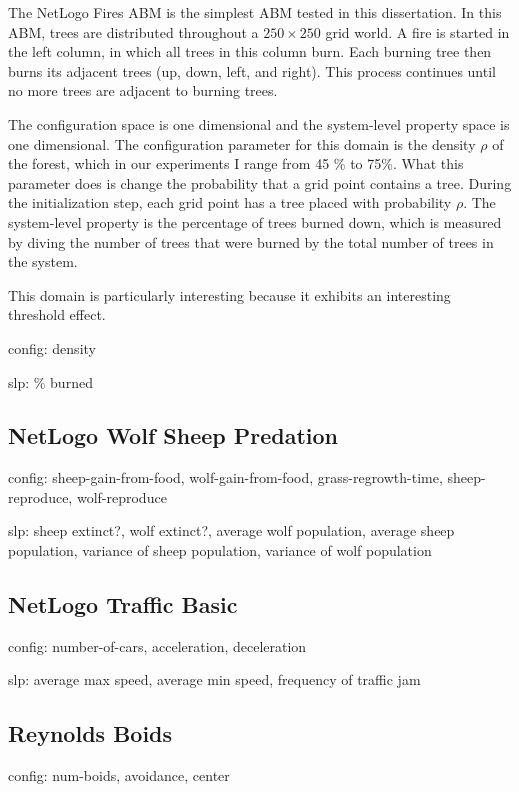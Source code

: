 The NetLogo Fires ABM is the simplest ABM tested in this dissertation.
In this ABM, trees are distributed throughout a $250 \times 250$ grid world.
A fire is started in the left column, in which all trees in this column burn.
Each burning tree then burns its adjacent trees (up, down, left, and right).
This process continues until no more trees are adjacent to burning trees.

The configuration space is one dimensional and the system-level property space is one dimensional.
The configuration parameter for this domain is the density $\rho$ of the forest, which in our experiments I range from 45 \% to 75\%.
What this parameter does is change the probability that a grid point contains a tree.
During the initialization step, each grid point has a tree placed with probability $\rho$.
The system-level property is the percentage of trees burned down, which is measured by diving the number of trees that were burned by the total number of trees in the system.


This domain is particularly interesting because it exhibits an interesting threshold effect.


config: density

slp: \% burned

 \subsection{NetLogo Wolf Sheep Predation}

config: sheep-gain-from-food, wolf-gain-from-food, grass-regrowth-time, sheep-reproduce, wolf-reproduce

slp: sheep extinct?, wolf extinct?, average wolf population, average sheep population, variance of sheep population, variance of wolf population

 \subsection{NetLogo Traffic Basic}

config: number-of-cars, acceleration, deceleration

slp: average max speed, average min speed, frequency of traffic jam

 \subsection{Reynolds Boids}

config: num-boids, avoidance, center

